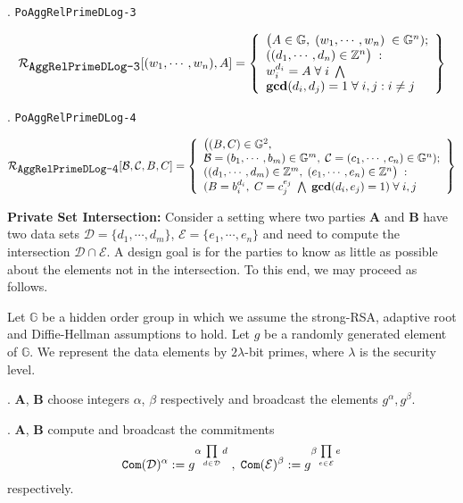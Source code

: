 \documentclass[11pt, lettersize, notitlepage, leqno, footskip=0.6cm]{article}
\newcommand{\bz}{\mathbb Z}
\newcommand{\pl}{\prod\limits}
\newcommand{\mc}{\mathcal}
\newcommand{\mb}{\mathbb}
\newcommand{\mbf}{\mathbf}
\newcommand{\al}{\alpha}
\newcommand{\be}{\beta}
\newcommand{\lam}{\lambda}
\newcommand{\vs}{\vspace{-0.15cm}}
\newcommand{\noin}{\noindent}
\newcommand{\GCD}{\mbf{gcd}}
\numberwithin{equation}{section}
\begin{document}
{\noin 12. \verb|PoAggRelPrimeDLog-3| \vspace{-0.3cm}

\[
  \mc{R}_{{\protect\verb|AggRelPrimeDLog-3|}}[(w_1,\cdots, w_n), A] = \left\{\begin{array}{l}
    \big(A\in\mb{G},\; (w_1,\cdots, w_n)\;\in\mb{G}^n);\\
    ((d_1,\cdots,d_n)\in\bz^n\big)\;: \\
    w_i^{d_i} = A\;\forall\;i\;\bigwedge  \\
   	\GCD(d_i, d_j) = 1\;\forall \;i,j: i\neq j
  \end{array}\right\}
\] 

\noin 13. \verb|PoAggRelPrimeDLog-4| \vspace{-0.7cm}

\[
  \mc{R}_{{\protect\verb|AggRelPrimeDLog-4|}}[\mc{B}, \mc{C}, B, C] = \left\{\begin{array}{l}
    \big((B,C)\in\mb{G}^2,\;\\
     \mc{B} = (b_1,\cdots,b_m)\in\mb{G}^m,\;\mc{C} = (c_1,\cdots, c_n)\in\mb{G}^n);\\
    ((d_1,\cdots,d_m)\in\bz^m,\; (e_1,\cdots,e_n)\in\bz^n\big)\;: \\
    (B = b_i^{d_i},\; C = c_j^{e_j}\;\bigwedge \; \GCD(d_i, e_j) = 1)\;\forall \;i,j
  \end{array}\right\}
\] 


\bigskip

\newpage


\noin \textbf{Private Set Intersection:} Consider a setting where two parties $\mbf{A}$ and $\mbf{B}$ have two data sets $\mc{D} = \{d_1,\cdots,d_m \}$, $\mc{E} = \{e_1,\cdots,e_n \}$ and need to compute the intersection $\mc{D}\cap \mc{E}$. A design goal is for the parties to know as little as possible about the elements not in the intersection. To this end, we may proceed as follows. 

Let $\mb{G}$ be a hidden order group in which we assume the strong-RSA, adaptive root and Diffie-Hellman assumptions to hold. Let $g$ be a randomly generated element of $\mb{G}$. We represent the data elements by $2\lam$-bit primes, where $\lam$ is the security level. \vspace{0.15cm}

\noin 1. $\mbf{A}$, $\mbf{B}$ choose integers $\al$, $\be$ respectively and broadcast the elements $g^{\al}, g^{\be}$.

\noin 2.  $\mbf{A}$, $\mbf{B}$ compute and broadcast the commitments \vs $$\protect{\verb|Com|}(\mc{D})^{\al}:= g^{\al\pl_{d\in\mc{D}} d }\;,\; \protect{\verb|Com|}(\mc{E})^{\be}:=  g^{\be\pl_{e\in\mc{E}} e } $$ respectively. 

}
\end{document}
